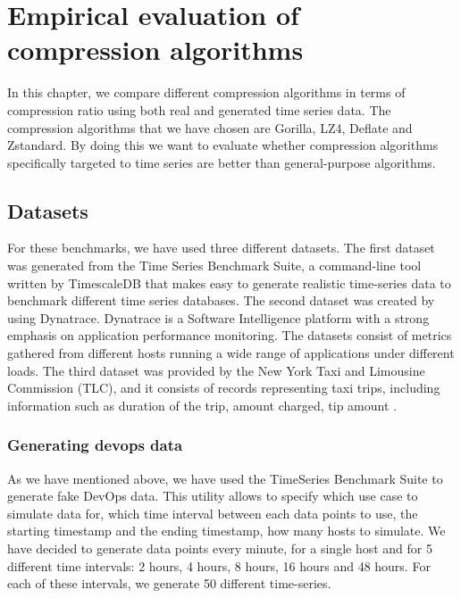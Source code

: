 \chapter{Empirical evaluation of compression algorithms}
In this chapter, we compare different compression algorithms in terms of compression ratio using both real
and generated time series data. The compression algorithms that we have chosen are Gorilla, LZ4,
Deflate and Zstandard. By doing this we want to evaluate whether compression algorithms specifically
targeted to time series are better than general-purpose algorithms.

\section{Datasets}
For these benchmarks, we have used three different datasets. The first dataset was generated from the
Time Series Benchmark Suite, a command-line tool written by TimescaleDB \cite{timescale_2019_timescaletsbs} that makes
easy to generate realistic time-series data to benchmark different time series databases.
The second dataset was created by using Dynatrace. Dynatrace is a Software Intelligence platform with a strong
emphasis on application performance monitoring. The datasets consist of metrics gathered from
different hosts running a wide range of applications under different loads.
The third dataset was provided by the New York Taxi and Limousine Commission (TLC), and it consists
of records representing taxi trips, including information such as duration of the trip, amount
charged, tip amount \cite{tlc2019_dataset}.

\subsection{Generating devops data}
As we have mentioned above, we have used the TimeSeries Benchmark Suite to generate fake DevOps data.
This utility allows to specify which use case to simulate data for, which time interval between each data points
to use, the starting timestamp and the ending timestamp, how many hosts to simulate.
We have decided to generate data points every minute, for a single host and for 5 different time intervals:
2 hours, 4 hours, 8 hours, 16 hours and 48 hours. For each of these intervals, we generate 50 different time-series.

